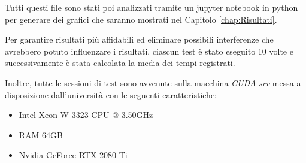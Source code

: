         Tutti questi file sono stati poi analizzati tramite un jupyter notebook in python per generare dei grafici che saranno mostrati nel Capitolo \ref{chap:Risultati}.

        Per garantire risultati più affidabili ed eliminare possibili interferenze che avrebbero potuto influenzare i risultati, ciascun test è stato eseguito 10 volte e successivamente è stata calcolata la media dei tempi registrati. 
        
        Inoltre, tutte le sessioni di test sono avvenute sulla macchina \textit{CUDA-srv} messa a disposizione dall'università con le seguenti caratteristiche:
        \begin{itemize}
            \item Intel Xeon W-3323 CPU @ 3.50GHz
            \item RAM 64GB
            \item Nvidia GeForce RTX 2080 Ti
        \end{itemize}

